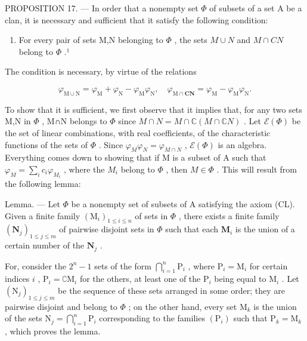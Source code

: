 PROPOSITION 17. --- In order that a nonempty set \(\Phi\) of subsets of a set A be a clan, it is necessary and sufficient that it satisfy the following condition:

\begin{enumerate}
\def\labelenumi{(\Roman{enumi})}
\setcounter{enumi}{149}
\tightlist
\item
  For every pair of sets M,N belonging to \(\Phi\) , the sets \(M\cup N\) and \(M\cap CN\) belong to \(\Phi\) .¹
\end{enumerate}

The condition is necessary, by virtue of the relations

\[
\varphi_ {\mathrm{M} \cup \mathrm{N}} = \varphi_ {\mathrm{M}} + \varphi_ {\mathrm{N}} - \varphi_ {\mathrm{M}} \varphi_ {\mathrm{N}}, \quad \varphi_ {\mathrm{M} \cap \mathbf {C N}} = \varphi_ {\mathrm{M}} - \varphi_ {\mathrm{M}} \varphi_ {\mathrm{N}}.
\]

To show that it is sufficient, we first observe that it implies that, for any two sets M,N in \(\Phi\) , M∩N belongs to \(\Phi\) since \(M\cap N=M\cap\mathbb{C}(M\cap\mathbb{C}N)\) . Let \(\mathcal{E}(\Phi)\) be the set of linear combinations, with real coefficients, of the characteristic functions of the sets of \(\Phi\) . Since \(\varphi_{M}\varphi_{N}=\varphi_{M\cap N}\) , \(\mathcal{E}(\Phi)\) is an algebra. Everything comes down to showing that if M is a subset of A such that \(\varphi_{M}=\sum_{i}c_{i}\varphi_{M_{i}}\) , where the \(M_{i}\) belong to \(\Phi\) , then \(M\in\Phi\) . This will result from the following lemma:

Lemma. --- Let \(\Phi\) be a nonempty set of subsets of A satisfying the axiom (CL). Given a finite family \((\mathrm{M}_i)_{1 \leqslant i \leqslant n}\) of sets in \(\Phi\) , there exists a finite family \((\mathbf{N}_j)_{1\leqslant j\leqslant m}\) of pairwise disjoint sets in \(\Phi\) such that each \(\mathbf{M}_i\) is the union of a certain number of the \(\mathbf{N}_j\) .

For, consider the \(2^{n} - 1\) sets of the form \(\bigcap_{i=1}^{n} \mathrm{P}_{i}\) , where \(\mathrm{P}_{i} = \mathrm{M}_{i}\) for certain indices \(i\) , \(\mathrm{P}_{i} = \complement \mathrm{M}_{i}\) for the others, at least one of the \(\mathrm{P}_{i}\) being equal to \(\mathrm{M}_{i}\) . Let \((\mathrm{N}_{j})_{1 \leqslant j \leqslant m}\) be the sequence of these sets arranged in some order; they are pairwise disjoint and belong to \(\Phi\) ; on the other hand, every set \(\mathrm{M}_{k}\) is the union of the sets \(\mathrm{N}_{j} = \bigcap_{i=1}^{n} \mathrm{P}_{i}\) corresponding to the families \((\mathrm{P}_{i})\) such that \(\mathrm{P}_{k} = \mathrm{M}_{k}\) , which proves the lemma.


